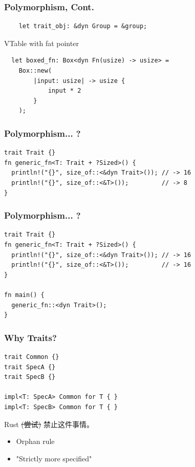\documentclass[UTF-8]{ctexbeamer}
\begin{document}
\begin{frame}[fragile]
  \frametitle{Polymorphism, Cont.}

  \begin{verbatim}
    let trait_obj: &dyn Group = &group;
  \end{verbatim}

  \pause
  \vspace{1em}

  VTable with fat pointer

  \pause
  \vspace{1em}
  
  \pause
  \begin{verbatim}
  let boxed_fn: Box<dyn Fn(usize) -> usize> =
    Box::new(
        |input: usize| -> usize {
            input * 2
        }
    );
  \end{verbatim}
\end{frame}

\begin{frame}[fragile]
  \frametitle{Polymorphism... ?}

  \begin{verbatim}
trait Trait {}
fn generic_fn<T: Trait + ?Sized>() {
  println!("{}", size_of::<&dyn Trait>()); // -> 16
  println!("{}", size_of::<&T>());         // -> 8
}
  \end{verbatim}
\end{frame}

\begin{frame}[fragile]
  \frametitle{Polymorphism... ?}

  \begin{verbatim}
trait Trait {}
fn generic_fn<T: Trait + ?Sized>() {
  println!("{}", size_of::<&dyn Trait>()); // -> 16
  println!("{}", size_of::<&T>());         // -> 16
}

fn main() {
  generic_fn::<dyn Trait>();
}
  \end{verbatim}
\end{frame}

\begin{frame}[fragile]
  \frametitle{Why Traits?}
  
  \pause


  \pause

  \begin{verbatim}
trait Common {}
trait SpecA {}
trait SpecB {}

impl<T: SpecA> Common for T { }
impl<T: SpecB> Common for T { }
  \end{verbatim}
  
  \pause
  \vspace{1em}

  Rust \sout{(尝试)} 禁止这件事情。
  \begin{itemize}
    \item Orphan rule
    \pause
    \item "Strictly more specified"
  \end{itemize}
\end{frame}
\end{document}
